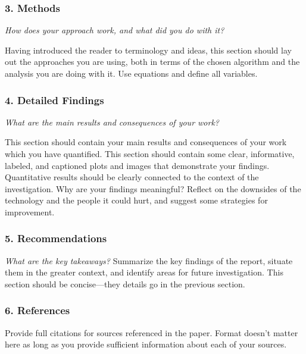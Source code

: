 \subsubsection{3. Methods}
\textit{How does your approach work, and what did you do with it?}

Having introduced the reader to terminology and ideas, this section should lay out the approaches you are using, both in terms of the chosen algorithm and the analysis you are doing with it.  Use equations and define all variables.

\subsubsection{4. Detailed Findings}
\textit{What are the main results and consequences of your work?}

This section should contain your main results and consequences of your work which you have quantified.  This section should contain some clear, informative, labeled, and captioned plots and images that demonstrate your findings. Quantitative results should be clearly connected to the context of the investigation. Why are your findings meaningful? Reflect on the downsides of the technology and the people it could hurt, and suggest some strategies for improvement. 

\subsubsection{5. Recommendations}
\textit{What are the key takeaways?}
Summarize the key findings of the report, situate them in the greater context, and identify areas for future investigation. This section should be concise---they details go in the previous section.

\subsubsection{6. References}

Provide full citations for sources referenced in the paper. Format doesn't matter here as long as you provide sufficient information about each of your sources.

